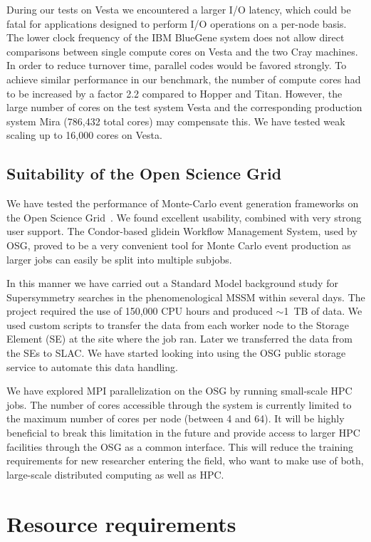\documentclass[12pt]{article}
\newcommand{\registered}{\textsuperscript{\textregistered}\xspace}
\begin{document}
During our
tests on Vesta we encountered a larger I/O latency, which could be fatal for applications
designed to perform I/O operations on a per-node basis. The lower clock frequency 
of the IBM BlueGene\registered system does not allow direct comparisons between single 
compute cores on Vesta and the two Cray machines. In order to reduce turnover time, 
parallel codes would be favored strongly. To achieve similar performance 
in our benchmark, the number of compute cores had to be increased by 
a factor 2.2 compared to Hopper and Titan. However, the large number of cores 
on the test system Vesta and the corresponding production system Mira (786,432 total cores) 
may compensate this. We have tested weak scaling up to 16,000 cores on Vesta. 

\subsection{Suitability of the Open Science Grid}
We have tested the performance of Monte-Carlo event generation frameworks
on the Open Science Grid~\cite{Altunay:2010zz,OSG}. We found excellent usability, 
combined with very strong user support. 
The Condor-based glidein Workflow Management System, used by OSG, 
proved to be a very convenient tool for Monte Carlo event production
as larger jobs can easily be split into multiple subjobs.

In this manner we have carried out a Standard Model background 
study for Supersymmetry searches in the phenomenological MSSM within several days. 
The project required the use of 150,000 CPU hours and produced $\sim$1~TB of data. 
We used custom scripts to transfer the data from each worker node to the 
Storage Element (SE) at the site where the job ran. Later we transferred 
the data from the SEs to SLAC. We have started looking into using the 
OSG public storage service to automate this data handling.

We have explored MPI parallelization on the OSG by running small-scale 
HPC jobs. The number of cores accessible through the system is currently 
limited to the maximum number of cores per node (between 4 and 64). 
It will be highly beneficial to break this limitation in the future and
provide access to larger HPC facilities through the OSG as a common
interface.  This will reduce the training requirements for new
researcher entering the field, who want to make use of both,
large-scale distributed computing as well as HPC.

\section{Resource requirements}
\end{document}
